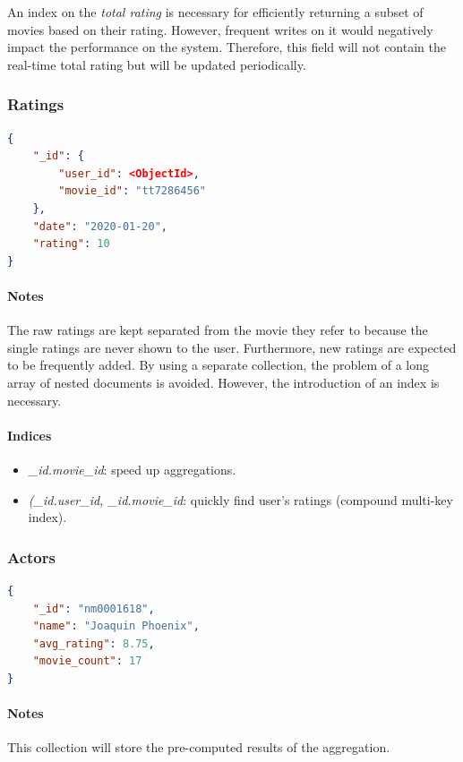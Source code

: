\documentclass[11pt]{article}
\begin{document}
An index on the \emph{total rating} is necessary for efficiently returning a 
subset of movies based on their rating. However, frequent writes on it would 
negatively impact the performance on the system. Therefore, this field will 
not contain the real-time total rating but will be updated periodically.

\subsubsection{Ratings}
\label{sec:ratings}

\begin{lstlisting}[language=json]	
{
	"_id": {
		"user_id": <ObjectId>,
		"movie_id": "tt7286456"
	},
	"date": "2020-01-20",
	"rating": 10
}
\end{lstlisting}

\paragraph{Notes}
The raw ratings are kept separated from the movie they refer to because the single 
ratings are never shown to the user. 
Furthermore, new ratings are expected to be frequently added.
By using a separate collection, the problem of a long array of nested documents 
is avoided. However, the introduction of an index is necessary.

\paragraph{Indices} 
\begin{itemize}
	\item \emph{\_id.movie\_id}: speed up aggregations.
	\item \emph{(\_id.user\_id, \_id.movie\_id}: quickly find user's ratings (compound multi-key index).
\end{itemize}

\subsubsection{Actors}
\label{sec:actors}

\begin{lstlisting}[language=json]	
{
	"_id": "nm0001618",
	"name": "Joaquin Phoenix",
	"avg_rating": 8.75,
	"movie_count": 17
}
\end{lstlisting}

\paragraph{Notes}
This collection will store the pre-computed results of the aggregation.
\end{document}

